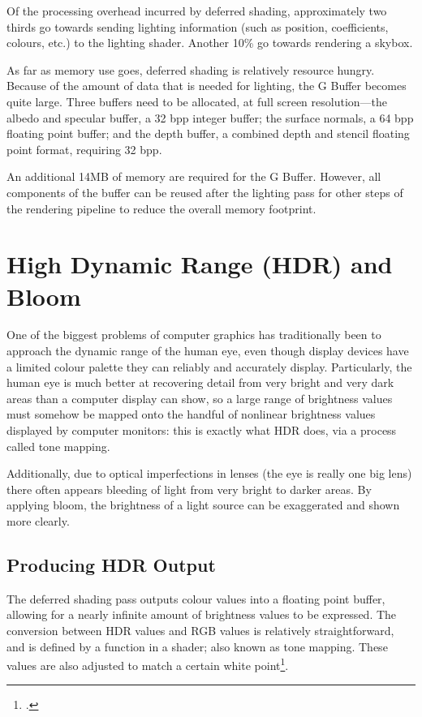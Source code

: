 \documentclass[11pt, oneside]{report}
\begin{document}
Of the processing overhead incurred by deferred shading, approximately two thirds go towards sending lighting information (such as position, coefficients, colours, etc.) to the lighting shader. Another 10\% go towards rendering a skybox.

As far as memory use goes, deferred shading is relatively resource hungry. Because of the amount of data that is needed for lighting, the \gls{G Buffer} becomes quite large. Three buffers need to be allocated, at full screen resolution---the albedo and specular buffer, a 32 \gls{bpp} integer buffer; the surface normals, a 64 \gls{bpp} floating point buffer; and the depth buffer, a combined depth and stencil floating point format, requiring 32 \gls{bpp}.

An additional 14MB of memory are required for the \gls{G Buffer}. However, all components of the buffer can be reused after the lighting pass for other steps of the rendering pipeline to reduce the overall memory footprint.

\chapter{High Dynamic Range (HDR) and Bloom}
One of the biggest problems of computer graphics has traditionally been to approach the dynamic range of the human eye, even though display devices have a limited colour palette they can reliably and accurately display. Particularly, the human eye is much better at recovering detail from very bright and very dark areas than a computer display can show, so a large range of brightness values must somehow be mapped onto the handful of nonlinear brightness values displayed by computer monitors: this is exactly what \gls{HDR} does, via a process called \gls{tone mapping}.

Additionally, due to optical imperfections in lenses (the eye is really one big lens) there often appears bleeding of light from very bright to darker areas. By applying \gls{bloom}, the brightness of a light source can be exaggerated and shown more clearly.

\section{Producing HDR Output}
The deferred shading pass outputs colour values into a \gls{floating point} buffer, allowing for a nearly infinite amount of brightness values to be expressed. The conversion between HDR values and \gls{RGB} values is relatively straightforward, and is defined by a function in a \gls{shader}; also known as \gls{tone mapping}. These values are also adjusted to match a certain \gls{white point}\footcite{hdr}.
\end{document}
